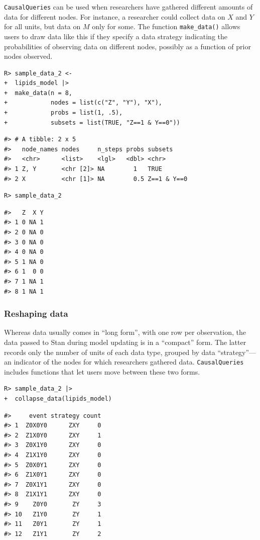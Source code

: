 \documentclass[
  11pt,
  article]{jss}
\begin{document}
\texttt{CausalQueries} can be used when researchers have gathered
different amounts of data for different nodes. For instance, a
researcher could collect data on \(X\) and \(Y\) for all units, but data
on \(M\) only for some. The function \texttt{make\_data()} allows users
to draw data like this if they specify a data strategy indicating the
probabilities of observing data on different nodes, possibly as a
function of prior nodes observed.

\begin{verbatim}
R> sample_data_2 <-
+  lipids_model |>
+  make_data(n = 8,
+            nodes = list(c("Z", "Y"), "X"),
+            probs = list(1, .5),
+            subsets = list(TRUE, "Z==1 & Y==0"))
\end{verbatim}

\begin{verbatim}
#> # A tibble: 2 x 5
#>   node_names nodes     n_steps probs subsets    
#>   <chr>      <list>    <lgl>   <dbl> <chr>      
#> 1 Z, Y       <chr [2]> NA        1   TRUE       
#> 2 X          <chr [1]> NA        0.5 Z==1 & Y==0
\end{verbatim}

\begin{verbatim}
R> sample_data_2
\end{verbatim}

\begin{verbatim}
#>   Z  X Y
#> 1 0 NA 1
#> 2 0 NA 0
#> 3 0 NA 0
#> 4 0 NA 0
#> 5 1 NA 0
#> 6 1  0 0
#> 7 1 NA 1
#> 8 1 NA 1
\end{verbatim}

\subsubsection{Reshaping data}\label{reshaping-data}

Whereas data usually comes in ``long form'', with one row per
observation, the data passed to Stan during model updating is in a
``compact'' form. The latter records only the number of units of each
data type, grouped by data ``strategy''---an indicator of the nodes for
which researchers gathered data. \texttt{CausalQueries} includes
functions that let users move between these two forms.

\begin{verbatim}
R> sample_data_2 |> 
+  collapse_data(lipids_model)
\end{verbatim}

\begin{verbatim}
#>     event strategy count
#> 1  Z0X0Y0      ZXY     0
#> 2  Z1X0Y0      ZXY     1
#> 3  Z0X1Y0      ZXY     0
#> 4  Z1X1Y0      ZXY     0
#> 5  Z0X0Y1      ZXY     0
#> 6  Z1X0Y1      ZXY     0
#> 7  Z0X1Y1      ZXY     0
#> 8  Z1X1Y1      ZXY     0
#> 9    Z0Y0       ZY     3
#> 10   Z1Y0       ZY     1
#> 11   Z0Y1       ZY     1
#> 12   Z1Y1       ZY     2
\end{verbatim}
\end{document}
